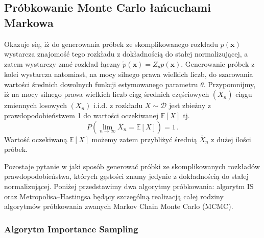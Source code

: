 \documentclass{myclass}
\numberwithin{equation}{subsection}
\begin{document}
\subsection{Próbkowanie Monte Carlo łańcuchami Markowa}

Okazuje się, iż do generowania próbek ze skomplikowanego rozkładu \(p(\mathbf{x})\) wystarcza
znajomość tego rozkładu z dokładnością do stałej normalizującej, a zatem wystarczy znać rozkład
łączny \(\tilde{p}(\mathbf{x}) = Z_p p(\mathbf{x})\). Generowanie próbek z kolei wystarcza
natomiast, na mocy silnego prawa wielkich liczb, do szacowania wartości średnich dowolnych funkcji
estymowanego parametru \(\theta\). Przypomnijmy, iż na mocy silnego prawa wielkich liczb ciąg
średnich częściowych \((\overline{X}_n)\) ciągu zmiennych losowych \((X_n)\) i.i.d. z rozkładu \(X
\sim \mathcal{D}\) jest zbieżny z prawdopodobieństwem 1 do wartości oczekiwanej \(\mathbb{E}[X]\)
tj.
\begin{equation}
    P\left(\lim_{n \to \infty} \overline{X}_n = \mathbb{E}[X]\right) = 1\,.
\end{equation}
Wartość oczekiwaną \(\mathbb{E}[X]\) możemy zatem przybliżyć średnią \(\overline{X}_n\) z dużej
ilości próbek.

Pozostaje pytanie w jaki sposób generować próbki ze skomplikowanych rozkładów prawdopodobieństwa,
których gęstości znamy jedynie z dokładnością do stałej normalizującej. Poniżej przedstawimy dwa
algorytmy próbkowania: algorytm IS oraz Metropolisa--Hastingsa będący szczególną realizacją całej
rodziny algorytmów próbkowania zwanych Markov Chain Monte Carlo (MCMC).

\subsubsection{Algorytm Importance Sampling}
\end{document}
